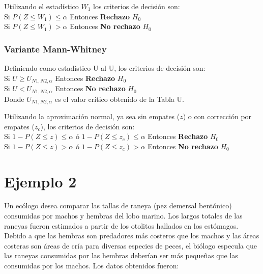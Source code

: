 \documentclass[]{book}
\theoremstyle{definition}
\theoremstyle{definition}
\theoremstyle{definition}
\theoremstyle{remark}
\begin{document}
Utilizando el estadístico \(W_1\) los criterios de decisión son:\\
Si \(P(Z≤W_1 )≤ \alpha\) Entonces \textbf{Rechazo} \(H_0\)\\
Si \(P(Z≤W_1 )> \alpha\) Entonces \textbf{No rechazo} \(H_0\)

\hypertarget{variante-mann-whitney-2}{%
\subsubsection{Variante Mann-Whitney}\label{variante-mann-whitney-2}}

Definiendo como estadístico U al U, los criterios de decisión son:\\
Si \(U≥U_{N1,N2,\alpha}\) Entonces \textbf{Rechazo} \(H_0\)\\
Si \(U<U_{N1,N2,\alpha}\) Entonces \textbf{No rechazo} \(H_0\)\\
Donde \(U_{N1,N2,\alpha}\) es el valor crítico obtenido de la Tabla U.

Utilizando la aproximación normal, ya sea sin empates (\(z\)) o con
corrección por empates (\(z_c\)), los criterios de decisión son:\\
Si \(1-P(Z≤z)≤\alpha\) ó \(1-P(Z≤z_c )≤\alpha\) Entonces
\textbf{Rechazo} \(H_0\)\\
Si \(1-P(Z≤z)>\alpha\) ó \(1-P(Z≤z_c )>\alpha\) Entonces \textbf{No
rechazo} \(H_0\)

\hypertarget{ejemplo-2}{%
\section{Ejemplo 2}\label{ejemplo-2}}

Un ecólogo desea comparar las tallas de raneya (pez demersal bentónico)
consumidas por machos y hembras del lobo marino. Los largos totales de
las raneyas fueron estimados a partir de los otolitos hallados en los
estómagos. Debido a que las hembras son predadores más costeros que los
machos y las áreas costeras son áreas de cría para diversas especies de
peces, el biólogo especula que las raneyas consumidas por las hembras
deberían ser más pequeñas que las consumidas por los machos. Los datos
obtenidos fueron:
\end{document}
